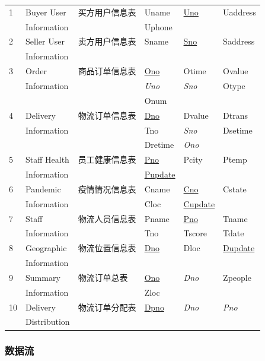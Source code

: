 \documentclass[12pt]{article}
\begin{document}
\begin{center}
\begin{supertabular}{llllll}
1 &	Buyer User &	买方用户信息表 & Uname &	\uline{Uno} &	Uaddress  \\ & Information &&	Uphone && \\
2 &	Seller User &	卖方用户信息表 & Sname &	\uline{Sno} &	Saddress \\ & Information &&&& \\
3 &	Order  & 商品订单信息表 &	\uline{Ono} &	Otime &	Ovalue  \\
& Information &&	\textit{Uno} &	\textit{Sno}  & Otype \\ &&& Onum & &\\
4 &	Delivery &	物流订单信息表 &	\uline{Dno} &	Dvalue &	Dtrans  \\ & Information && Tno &	\textit{Sno} & Dsetime \\ &&& Dretime & \textit{Ono} & \\
5 &	Staff Health &	员工健康信息表 &	\uline{Pno} &	Pcity & Ptemp \\ 
& Information && \uline{Pupdate} && \\
6 &	Pandemic &	疫情情况信息表 &	Cname &	\uline{Cno} &	Cstate \\	& Information &&  Cloc & \uline{Cupdate}	& \\
7 &Staff  &	物流人员信息表 &	Pname &	\uline{Pno} &	Tname \\ & Information	& & Tno & Tscore & Tdate \\
8 &	Geographic  &	物流位置信息表 &	\uline{Dno} &	Dloc &	\uline{Dupdate} \\& Information&&&& \\
9 & Summary & 物流订单总表 & \uline{Ono} & \textit{Dno} & Zpeople \\ & Information && Zloc && \\
10 & Delivery & 物流订单分配表 & \uline{Dpno} & \textit{Dno} & \textit{Pno}\\ & Distribution &&&& \\
\end{supertabular}
\end{center}

\subsubsection{数据流}

\tabletail{\bottomrule}
\end{document}
